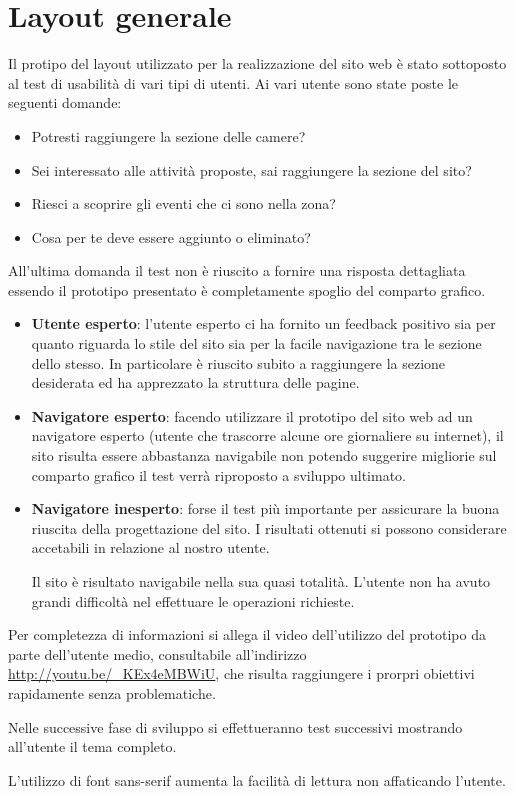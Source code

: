 \documentclass[a4paper,12pt,hidelinks]{report}
\begin{document}
\section*{Layout generale}
Il protipo del layout utilizzato per la realizzazione del sito web è stato sottoposto al test di usabilità di vari tipi di utenti.
Ai vari utente sono state poste le seguenti domande:
\begin{itemize}
 \item Potresti raggiungere la sezione delle camere?
 \item Sei interessato alle attività proposte, sai raggiungere la sezione del sito?
 \item Riesci a scoprire gli eventi che ci sono nella zona?
 \item Cosa per te deve essere aggiunto o eliminato?
\end{itemize}
All'ultima domanda il test non è riuscito a fornire una risposta dettagliata essendo il prototipo presentato è completamente spoglio del comparto grafico.

\begin{itemize}
 \item \textbf{Utente esperto}: l'utente esperto ci ha fornito un feedback positivo sia per quanto riguarda lo stile del sito sia per la facile navigazione tra le sezione
 dello stesso. In particolare è riuscito subito a raggiungere la sezione desiderata ed ha apprezzato la struttura delle pagine.
 \item \textbf{Navigatore esperto}: facendo utilizzare il prototipo del sito web ad un navigatore esperto (utente che trascorre alcune ore giornaliere su internet), il sito 
 risulta essere abbastanza navigabile non potendo suggerire migliorie sul comparto grafico il test verrà riproposto a sviluppo ultimato.
 \item \textbf{Navigatore inesperto}: forse il test più importante per assicurare la buona riuscita della progettazione del sito. I risultati ottenuti si possono considerare 
 accetabili in relazione al nostro utente. 
 \par Il sito è risultato navigabile nella sua quasi totalità. L'utente non ha avuto grandi difficoltà nel effettuare le operazioni richieste.
\end{itemize}
Per completezza di informazioni si allega il video dell'utilizzo del prototipo da parte dell'utente medio, consultabile all'indirizzo \url{http://youtu.be/_KEx4eMBWiU}, che risulta raggiungere i prorpri obiettivi rapidamente senza 
problematiche.
\par Nelle successive fase di sviluppo si effettueranno test successivi mostrando all'utente il tema completo.
\par L'utilizzo di font sans-serif aumenta la facilità di lettura non affaticando l'utente.
\end{document}
